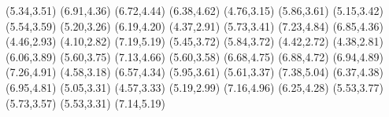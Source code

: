 \psdot[](5.34,3.51)
\psdot[](6.91,4.36)
\psdot[](6.72,4.44)
\psdot[](6.38,4.62)
\psdot[](4.76,3.15)
\psdot[](5.86,3.61)
\psdot[](5.15,3.42)
\psdot[](5.54,3.59)
\psdot[](5.20,3.26)
\psdot[](6.19,4.20)
\psdot[](4.37,2.91)
\psdot[](5.73,3.41)
\psdot[](7.23,4.84)
\psdot[](6.85,4.36)
\psdot[](4.46,2.93)
\psdot[](4.10,2.82)
\psdot[](7.19,5.19)
\psdot[](5.45,3.72)
\psdot[](5.84,3.72)
\psdot[](4.42,2.72)
\psdot[](4.38,2.81)
\psdot[](6.06,3.89)
\psdot[](5.60,3.75)
\psdot[](7.13,4.66)
\psdot[](5.60,3.58)
\psdot[](6.68,4.75)
\psdot[](6.88,4.72)
\psdot[](6.94,4.89)
\psdot[](7.26,4.91)
\psdot[](4.58,3.18)
\psdot[](6.57,4.34)
\psdot[](5.95,3.61)
\psdot[](5.61,3.37)
\psdot[](7.38,5.04)
\psdot[](6.37,4.38)
\psdot[](6.95,4.81)
\psdot[](5.05,3.31)
\psdot[](4.57,3.33)
\psdot[](5.19,2.99)
\psdot[](7.16,4.96)
\psdot[](6.25,4.28)
\psdot[](5.53,3.77)
\psdot[](5.73,3.57)
\psdot[](5.53,3.31)
\psdot[](7.14,5.19)
